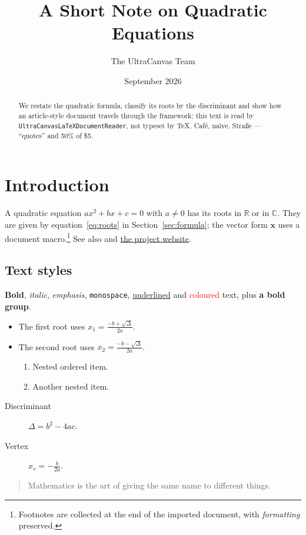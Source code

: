 \documentclass[11pt]{article}
\title{A Short Note on Quadratic Equations}
\author{The UltraCanvas Team}
\date{September 2026}
\newcommand{\R}{\mathbb{R}}
\newcommand{\vect}[1]{\mathbf{#1}}
\begin{document}
\maketitle

\begin{abstract}
We restate the quadratic formula, classify its roots by the discriminant
and show how an article-style document travels through the framework:
this text is read by \texttt{UltraCanvasLaTeXDocumentReader}, not
typeset by \TeX. Caf\'e, na\"{\i}ve, Stra{\ss}e --- ``quotes'' and 50\% of \$5.
\end{abstract}

\section{Introduction}\label{sec:intro}
A quadratic equation $ax^2 + bx + c = 0$ with $a \neq 0$ has its roots in
$\R$ or in $\mathbb{C}$. They are given by equation~\eqref{eq:roots} in
Section~\ref{sec:formula}; the vector form $\vect{x}$ uses a document
macro.\footnote{Footnotes are collected at the end of the imported
document, with \emph{formatting} preserved.} See also \cite{knuth84} and
\href{https://ultra-os.org}{the project website}.

\subsection{Text styles}
\textbf{Bold}, \textit{italic}, \emph{emphasis}, \texttt{monospace},
\underline{underlined} and \textcolor{red}{coloured} text, plus
{\bfseries a bold group}.
\begin{itemize}
  \item The first root uses $x_1 = \frac{-b + \sqrt{\Delta}}{2a}$.
  \item The second root uses $x_2 = \frac{-b - \sqrt{\Delta}}{2a}$.
  \begin{enumerate}
    \item Nested ordered item.
    \item Another nested item.
  \end{enumerate}
\end{itemize}
\begin{description}
  \item[Discriminant] $\Delta = b^2 - 4ac$.
  \item[Vertex] $x_v = -\frac{b}{2a}$.
\end{description}
\begin{quote}
Mathematics is the art of giving the same name to different things.
\end{quote}
\end{document}
